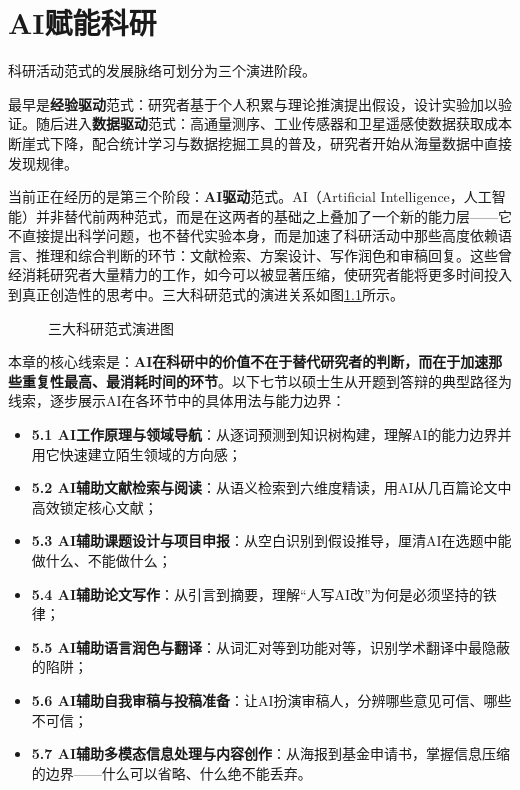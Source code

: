 
\chapter{AI赋能科研}


科研活动范式的发展脉络可划分为三个演进阶段。

最早是\textbf{经验驱动}范式：研究者基于个人积累与理论推演提出假设，设计实验加以验证。随后进入\textbf{数据驱动}范式：高通量测序、工业传感器和卫星遥感使数据获取成本断崖式下降，配合统计学习与数据挖掘工具的普及，研究者开始从海量数据中直接发现规律。

当前正在经历的是第三个阶段：\textbf{AI驱动}范式。AI（Artificial Intelligence，人工智能）并非替代前两种范式，而是在这两者的基础之上叠加了一个新的能力层——它不直接提出科学问题，也不替代实验本身，而是加速了科研活动中那些高度依赖语言、推理和综合判断的环节：文献检索、方案设计、写作润色和审稿回复。这些曾经消耗研究者大量精力的工作，如今可以被显著压缩，使研究者能将更多时间投入到真正创造性的思考中。三大科研范式的演进关系如图\ref{fig:ch5_01}所示。

\begin{figure}[H]
\centering
{}
\caption{三大科研范式演进图}
\label{fig:ch5_01}
\end{figure}
\par

本章的核心线索是：\textbf{AI在科研中的价值不在于替代研究者的判断，而在于加速那些重复性最高、最消耗时间的环节}。以下七节以硕士生从开题到答辩的典型路径为线索，逐步展示AI在各环节中的具体用法与能力边界：

\begin{itemize}[nosep]
\item \textbf{5.1 AI工作原理与领域导航}：从逐词预测到知识树构建，理解AI的能力边界并用它快速建立陌生领域的方向感；
\item \textbf{5.2 AI辅助文献检索与阅读}：从语义检索到六维度精读，用AI从几百篇论文中高效锁定核心文献；
\item \textbf{5.3 AI辅助课题设计与项目申报}：从空白识别到假设推导，厘清AI在选题中能做什么、不能做什么；
\item \textbf{5.4 AI辅助论文写作}：从引言到摘要，理解``人写AI改''为何是必须坚持的铁律；
\item \textbf{5.5 AI辅助语言润色与翻译}：从词汇对等到功能对等，识别学术翻译中最隐蔽的陷阱；
\item \textbf{5.6 AI辅助自我审稿与投稿准备}：让AI扮演审稿人，分辨哪些意见可信、哪些不可信；
\item \textbf{5.7 AI辅助多模态信息处理与内容创作}：从海报到基金申请书，掌握信息压缩的边界——什么可以省略、什么绝不能丢弃。
\end{itemize}

